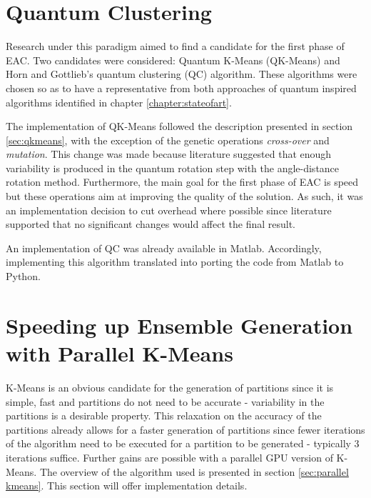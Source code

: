 \section{Quantum Clustering}

Research under this paradigm aimed to find a candidate for the first phase of EAC.
Two candidates were considered: Quantum K-Means (QK-Means) and Horn and Gottlieb's quantum clustering (QC) algorithm.
These algorithms were chosen so as to have a representative from both approaches of quantum inspired algorithms identified in chapter \ref{chapter:stateofart}.


The implementation of QK-Means followed the description presented in section \ref{sec:qkmeans}, with the exception of the genetic operations \emph{cross-over} and \emph{mutation}.
This change was made because literature \cite{Liu2010} suggested that enough variability is produced in the quantum rotation step with the angle-distance rotation method.
Furthermore, the main goal for the first phase of EAC is speed but these operations aim at improving the quality of the solution.
As such, it was an implementation decision to cut overhead where possible since literature supported that no significant changes would affect the final result.

An implementation of QC was already available in Matlab.
Accordingly, implementing this algorithm translated into porting the code from Matlab to Python.




\section{Speeding up Ensemble Generation with Parallel K-Means}

K-Means is an obvious candidate for the generation of partitions since it is simple, fast and partitions do not need to be accurate - variability in the partitions is a desirable property.
This relaxation on the accuracy of the partitions already allows for a faster generation of partitions since fewer iterations of the algorithm need to be executed for a partition to be generated - typically 3 iterations suffice.
Further gains are possible with a parallel GPU version of K-Means.
The overview of the algorithm used is presented in section \ref{sec:parallel kmeans}.
This section will offer implementation details.

